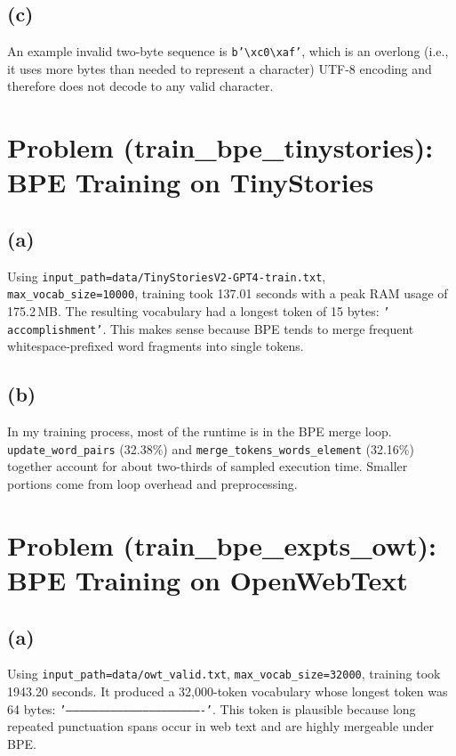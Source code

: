 \documentclass[11pt]{article}
\begin{document}
\subsection*{(c)}
An example invalid two-byte sequence is \texttt{b'\textbackslash xc0\textbackslash xaf'}, which is an overlong (i.e., it uses more bytes than needed to represent a character) UTF-8 encoding and therefore does not decode to any valid character.

\section{Problem (train\_bpe\_tinystories): BPE Training on TinyStories}
\subsection*{(a)}
Using \texttt{input\_path=data/TinyStoriesV2-GPT4-train.txt}, \texttt{max\_vocab\_size=10000}, training took 137.01 seconds with a peak RAM usage of 175.2\,MB. The resulting vocabulary had a longest token of 15 bytes: \texttt{' accomplishment'}. This makes sense because BPE tends to merge frequent whitespace-prefixed word fragments into single tokens.

\subsection*{(b)}
In my training process, most of the runtime is in the BPE merge loop. \texttt{update\_word\_pairs} (32.38\%) and \texttt{merge\_tokens\_words\_element} (32.16\%) together account for about two-thirds of sampled execution time. Smaller portions come from loop overhead and preprocessing.

\section{Problem (train\_bpe\_expts\_owt): BPE Training on OpenWebText}
\subsection*{(a)}
Using \texttt{input\_path=data/owt\_valid.txt}, \texttt{max\_vocab\_size=32000}, training took 1943.20 seconds. It produced a 32,000-token vocabulary whose longest token was 64 bytes: \texttt{'----------------------------------------------------------------'}. This token is plausible because long repeated punctuation spans occur in web text and are highly mergeable under BPE.
\end{document}
